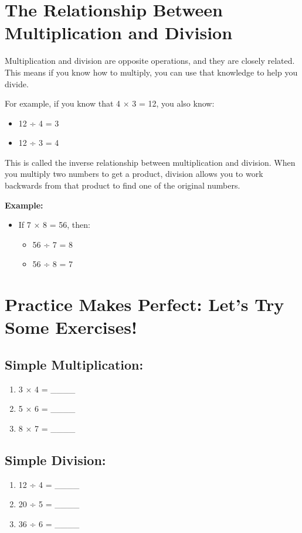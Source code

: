 \section{The Relationship Between Multiplication and Division}
Multiplication and division are opposite operations, and they are closely related. This means if you know how to multiply, you can use that knowledge to help you divide.

For example, if you know that 4 × 3 = 12, you also know:
\begin{itemize}
    \item 12 ÷ 4 = 3
    \item 12 ÷ 3 = 4
\end{itemize}

This is called the inverse relationship between multiplication and division. When you multiply two numbers to get a product, division allows you to work backwards from that product to find one of the original numbers.

\textbf{Example:}
\begin{itemize}
    \item If 7 × 8 = 56, then:
    \begin{itemize}
        \item 56 ÷ 7 = 8
        \item 56 ÷ 8 = 7
    \end{itemize}
\end{itemize}

\section{Practice Makes Perfect: Let’s Try Some Exercises!}
\subsection{Simple Multiplication:}
\begin{enumerate}
    \item 3 × 4 = \_\_\_\_
    \item 5 × 6 = \_\_\_\_
    \item 8 × 7 = \_\_\_\_
\end{enumerate}

\subsection{Simple Division:}
\begin{enumerate}
    \item 12 ÷ 4 = \_\_\_\_
    \item 20 ÷ 5 = \_\_\_\_
    \item 36 ÷ 6 = \_\_\_\_
\end{enumerate}

